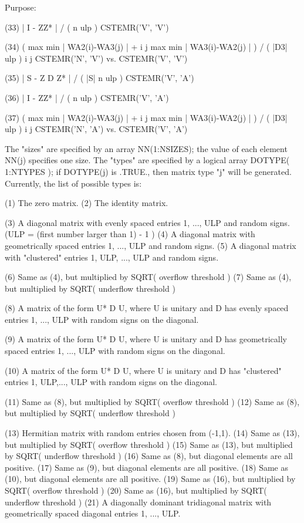 \begin{DoxyParagraph}{Purpose\+: }
\begin{DoxyVerb}
 (33)    | I - ZZ* | / ( n ulp )           CSTEMR('V', 'V')

 (34)    ( max { min | WA2(i)-WA3(j) | } +
            i     j
           max { min | WA3(i)-WA2(j) | } ) / ( |D3| ulp )
            i     j
         CSTEMR('N', 'V') vs. CSTEMR('V', 'V')

 (35)    | S - Z D Z* | / ( |S| n ulp )    CSTEMR('V', 'A')

 (36)    | I - ZZ* | / ( n ulp )           CSTEMR('V', 'A')

 (37)    ( max { min | WA2(i)-WA3(j) | } +
            i     j
           max { min | WA3(i)-WA2(j) | } ) / ( |D3| ulp )
            i     j
         CSTEMR('N', 'A') vs. CSTEMR('V', 'A')

 The "sizes" are specified by an array NN(1:NSIZES); the value of
 each element NN(j) specifies one size.
 The "types" are specified by a logical array DOTYPE( 1:NTYPES );
 if DOTYPE(j) is .TRUE., then matrix type "j" will be generated.
 Currently, the list of possible types is:

 (1)  The zero matrix.
 (2)  The identity matrix.

 (3)  A diagonal matrix with evenly spaced entries
      1, ..., ULP  and random signs.
      (ULP = (first number larger than 1) - 1 )
 (4)  A diagonal matrix with geometrically spaced entries
      1, ..., ULP  and random signs.
 (5)  A diagonal matrix with "clustered" entries 1, ULP, ..., ULP
      and random signs.

 (6)  Same as (4), but multiplied by SQRT( overflow threshold )
 (7)  Same as (4), but multiplied by SQRT( underflow threshold )

 (8)  A matrix of the form  U* D U, where U is unitary and
      D has evenly spaced entries 1, ..., ULP with random signs
      on the diagonal.

 (9)  A matrix of the form  U* D U, where U is unitary and
      D has geometrically spaced entries 1, ..., ULP with random
      signs on the diagonal.

 (10) A matrix of the form  U* D U, where U is unitary and
      D has "clustered" entries 1, ULP,..., ULP with random
      signs on the diagonal.

 (11) Same as (8), but multiplied by SQRT( overflow threshold )
 (12) Same as (8), but multiplied by SQRT( underflow threshold )

 (13) Hermitian matrix with random entries chosen from (-1,1).
 (14) Same as (13), but multiplied by SQRT( overflow threshold )
 (15) Same as (13), but multiplied by SQRT( underflow threshold )
 (16) Same as (8), but diagonal elements are all positive.
 (17) Same as (9), but diagonal elements are all positive.
 (18) Same as (10), but diagonal elements are all positive.
 (19) Same as (16), but multiplied by SQRT( overflow threshold )
 (20) Same as (16), but multiplied by SQRT( underflow threshold )
 (21) A diagonally dominant tridiagonal matrix with geometrically
      spaced diagonal entries 1, ..., ULP.\end{DoxyVerb}
 
\end{DoxyParagraph}

